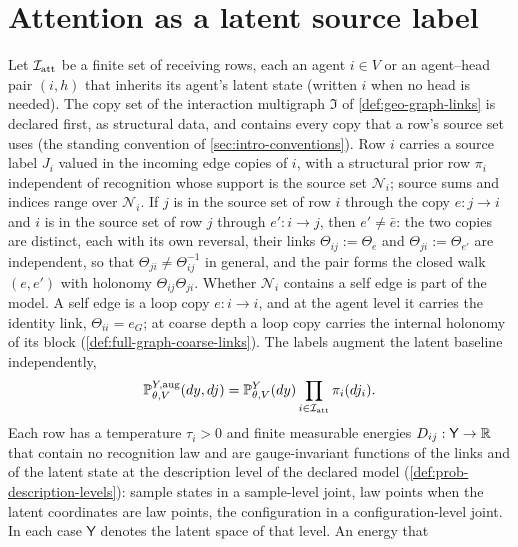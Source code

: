 \section{Attention as a latent source label}
\label{sec:local-attention-elbo}

Let \(\mathcal I_{\rm att}\) be a finite set of receiving rows, each an agent
\(i\in V\) or an agent--head pair \((i,h)\) that inherits its agent's latent
state (written \(i\) when no head is needed). The copy set of the interaction
multigraph \(\mathfrak I\) of \cref{def:geo-graph-links} is declared first, as
structural data, and contains every copy that a row's source set uses (the
standing convention of \cref{sec:intro-conventions}). Row \(i\) carries a
source label \(J_i\) valued in the incoming edge copies of \(i\), with a
structural prior row \(\pi_i\) independent of recognition whose support is the
source set \(\mathcal N_i\); source sums and indices range over
\(\mathcal N_i\). If \(j\) is in the source set of row \(i\) through the copy
\(e:j\to i\) and \(i\) is in the source set of row \(j\) through
\(e':i\to j\), then \(e'\ne\bar e\): the two copies are distinct, each with
its own reversal, their links \(\Theta_{ij}:=\Theta_e\) and
\(\Theta_{ji}:=\Theta_{e'}\) are independent, so that
\(\Theta_{ji}\ne\Theta_{ij}^{-1}\) in general, and the pair forms the closed
walk \((e,e')\) with holonomy \(\Theta_{ij}\Theta_{ji}\). Whether
\(\mathcal N_i\) contains a self edge is part of the model. A self edge is a
loop copy \(e:i\to i\), and at the agent level it carries the identity link,
\(\Theta_{ii}=e_G\); at coarse depth a loop copy carries the internal
holonomy of its block (\cref{def:full-graph-coarse-links}). The
labels augment the latent baseline independently,
\begin{equation}
\mathbb P_{\theta,V}^{Y,\mathrm{aug}}(dy,dj)
=\mathbb P_{\theta,V}^{Y}(dy)
\prod_{i\in\mathcal I_{\rm att}}\pi_i(dj_i).
\label{eq:obs-attention-augmented-baseline}
\end{equation}
Each row has a temperature \(\tau_i>0\) and finite measurable energies
\(D_{ij}:\mathsf Y\to\mathbb R\) that contain no recognition law and are
gauge-invariant functions of the links and of the latent state at the
description level of the declared model (\cref{def:prob-description-levels}):
sample states in a sample-level joint, law points when the latent coordinates
are law points, the configuration in a configuration-level joint. In each
case \(\mathsf Y\) denotes the latent space of that level. An energy that
